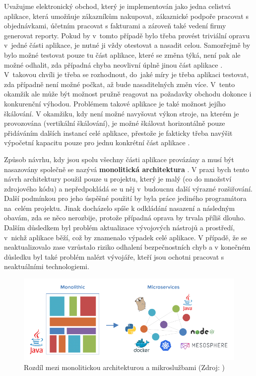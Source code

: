 \documentclass[FM,DP]{tulthesis}
\begin{document}
Uvažujme elektronický obchod, který je implementován jako jedna celistvá aplikace, která umožňuje
zákazníkům nakupovat, zákaznické podpoře pracovat s objednávkami, účetním pracovat s fakturami
a zároveň také vedení firmy generovat reporty. Pokud by v~tomto případě bylo třeba provést triviální 
opravu v~jedné části aplikace, je nutné ji vždy otestovat a nasadit celou. Samozřejmě by bylo možné
testovat pouze tu část aplikace, které se změna týká, není pak ale možné odhalit, zda případná chyba
neovlivní úplně jinou část aplikace \cite[strana~77]{devops}. V~takovou chvíli je třeba se rozhodnout, do~jaké 
míry je třeba aplikaci testovat, zda případně není možné počkat, až bude nasaditelných změn více. V~tento 
okamžik ale může být možnost pružně reagovat na požadavky obchodu dokonce i konkurenční výhodou.
Problémem takové aplikace je také možnost jejího škálování. V okamžiku, kdy není možné navyšovat
výkon stroje, na kterém je provozována (vertikální škálování), je možné škálovat horizontálně pouze 
přidáváním dalších instancí celé aplikace, přestože je fakticky třeba navýšit výpočetní kapacitu pouze 
pro jednu konkrétní část aplikace \cite[strana~78]{devops}.

Způsob návrhu, kdy jsou spolu všechny části aplikace provázány a musí být nasazovány společně se
nazývá \textbf{monolitická architektura} \cite[strana~7]{microservices}. V praxi bych tento návrh architektury 
použil pouze u projektu, který je malý (co do množství zdrojového kódu) a nepředpokládá se u něj v~budoucnu 
další výrazné rozšiřování. Další podmínkou pro jeho úspěšné použití by byla práce jediného programátora na~celém 
projektu. Jinak docházelo spíše k odkládání nasazení a následným obavám, zda se něco nerozbije, protože případná
oprava by trvala příliš dlouho. Dalším důsledkem byl problém aktualizace vývojových nástrojů a prostředí, 
v~nichž aplikace běží, což by znamenalo výpadek celé aplikace. V případě, že se neaktualizovalo zase vzrůstalo
riziko odhalení bezpečnostních chyb a v konečném důsledku byl také problém nalézt vývojáře, kteří jsou ochotni
pracovat s neaktuálními technologiemi.

\begin{figure}[h]
\center
\includegraphics[width=\textwidth]{monolit-vs-microservices.png}
\caption{Rozdíl mezi monolitickou architekturou a mikroslužbami (Zdroj: \cite{microservices-blog})}
\label{monolit-vs-microservices}
\end{figure}
\end{document}
